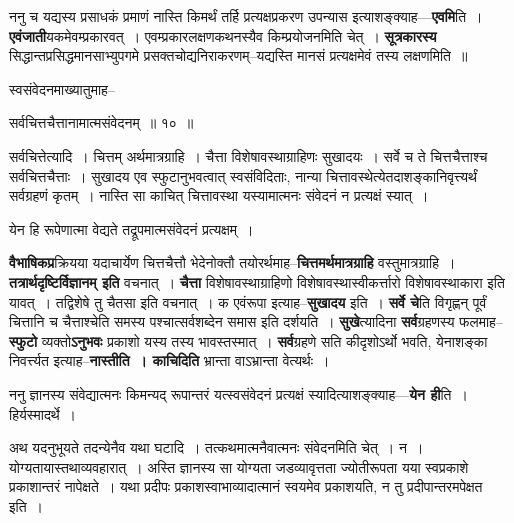 \documentclass[article,12pt,a4paper]{memoir}
\begin{document}
	  \pstart ननु च यद्यस्य प्रसाधकं प्रमाणं नास्ति किमर्थं तर्हि प्रत्यक्षप्रकरण उपन्यास इत्याशङ्क्याह—\textbf{एवमि}ति । \textbf{एवंजाती}यकमेवम्प्रकारवत् । एवम्प्रकारलक्षणकथनस्यैव किम्प्रयोजनमिति चेत् । \textbf{सूत्रकारस्य} सिद्धान्तप्रसिद्धमानसाभ्युपगमे प्रसक्तचोद्यनिराकरणम्--यद्यस्ति मानसं प्रत्यक्षमेवं तस्य लक्षणमिति ॥
	\pend
	  \bigskip
	  \begingroup
	

	  \pstart स्वसंवेदनमाख्यातुमाह--
	\pend
        
	  \bigskip
	  \begingroup
	

	  \pstart सर्वचित्तचैत्तानामात्मसंवेदनम् ॥ १० ॥
	\pend
      
	  \endgroup
	 

	  \pstart {}सर्वचित्तेत्यादि । चित्तम् अर्थमात्रग्राहि । चैत्ता विशेषावस्थाग्राहिणः सुखादयः । सर्वे च ते चित्तचैत्ताश्च सर्वचित्तचैत्ताः । सुखादय एव स्फुटानुभवत्वात् स्वसंविदिताः, नान्या चित्तावस्थेत्येतदाशङ्कानिवृत्त्यर्थं सर्वग्रहणं कृतम् । नास्ति सा काचित् चित्तावस्था यस्यामात्मनः संवेदनं न प्रत्यक्षं स्यात् ।
	\pend
        

	  \pstart येन हि रूपेणात्मा वेद्यते तद्रूपमात्मसंवेदनं प्रत्यक्षम् ।
	\pend
      
	  \endgroup
	

	  \pstart \textbf{वैभाषिकप्र}क्रियया यदाचार्येण चित्तचैत्तौ भेदेनोक्तौ तयोरर्थमाह--\textbf{चित्तमर्थमात्रग्राहि} वस्तुमात्रग्राहि । \textbf{तत्रार्थदृष्टिर्विज्ञानम् इति} वचनात् । \textbf{चैत्ता} विशेषावस्थाग्राहिणो विशेषावस्थास्वीकर्त्तारो विशेषावस्थाकारा इति यावत् । तद्विशेषे तु चैतसा इति वचनात् । क एवंरूपा इत्याह--\textbf{सुखादय} इति । \textbf{सर्वे चे}ति विगृह्णन् पूर्वं चित्तानि च चैत्ताश्चेति समस्य पश्चात्सर्वशब्देन समास इति दर्शयति । \textbf{सुखे}त्यादिना \textbf{सर्व}ग्रहणस्य फलमाह--\textbf{स्फुटो} व्यक्तो\textbf{ऽनुभवः} प्रकाशो यस्य तस्य भावस्तस्मात् । \textbf{सर्व}ग्रहणे सति कीदृशोऽर्थो भवति, येनाशङ्का निवर्त्त्यत इत्याह--\textbf{नास्तीति । काचिदिति} भ्रान्ता वाऽभ्रान्ता वेत्यर्थः ।
	\pend
      

	  \pstart ननु ज्ञानस्य संवेद्यात्मनः किमन्यद् रूपान्तरं यत्स्वसंवेदनं प्रत्यक्षं स्यादित्याशङ्क्याह—\textbf{येन ही}ति । हिर्यस्मादर्थे ।
	\pend
      

	  \pstart अथ यदनुभूयते तदन्येनैव यथा घटादि । तत्कथमात्मनैवात्मनः संवेदनमिति चेत् । न । योग्यतायास्तथाव्यवहारात् । अस्ति ज्ञानस्य सा योग्यता जडव्यावृत्तता ज्योतीरूपता यया स्वप्रकाशे प्रकाशान्तरं नापेक्षते । यथा प्रदीपः प्रकाशस्वाभाव्यादात्मानं स्वयमेव प्रकाशयति, न तु प्रदीपान्तरमपेक्षत इति ।
	\pend
      
\end{document}
